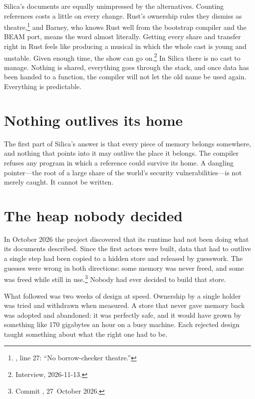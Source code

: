 Silica's documents are equally unimpressed by the alternatives. Counting
references costs a little on every change. Rust's ownership rules they dismiss
as theatre,\footnote{, line 27: ``No
borrow-checker theatre.''} and Barney, who knows Rust well from the bootstrap
compiler and the BEAM port, means the word almost literally. Getting every share
and transfer right in Rust feels like producing a musical in which the whole cast
is young and unstable. Given enough time, the show can go on.\footnote{Interview,
2026-11-13.} In Silica there is no cast to manage. Nothing is shared, everything
goes through the stack, and once data has been handed to a function, the
compiler will not let the old name be used again. Everything is predictable.


\section{Nothing outlives its home}

The first part of Silica's answer is that every piece of memory belongs
somewhere, and nothing that points into it may outlive the place it belongs.
The compiler refuses any program in which a reference could survive its home.
A dangling pointer---the root of a large share of the world's security
vulnerabilities---is not merely caught. It cannot be written.

\section{The heap nobody decided}

In October 2026 the project discovered that its runtime had not been doing what
its documents described. Since the first actors were built, data that had to
outlive a single step had been copied to a hidden store and released by
guesswork. The guesses were wrong in both directions: some memory was never
freed, and some was freed while still in use.\footnote{Commit
, 27~October 2026.} Nobody had ever decided to build that
store.

What followed was two weeks of design at speed. Ownership by a single holder
was tried and withdrawn when measured. A store that never gave memory back was
adopted and abandoned: it was perfectly safe, and it would have grown by
something like 170 gigabytes an hour on a busy machine. Each rejected design
taught something about what the right one had to be.

